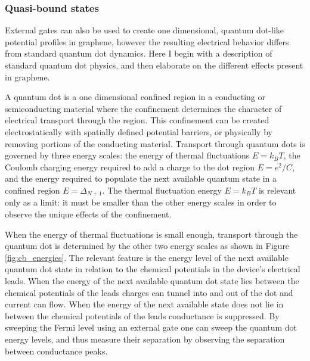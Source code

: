 \documentclass[edeposit,fullpage,draftthesis]{uiucthesis2009}
\begin{document}
        \subsubsection*{Quasi-bound states}
        
        External gates can also be used to create one dimensional, quantum dot-like potential profiles in graphene,
        however the resulting electrical behavior differs from standard quantum dot dynamics. Here I begin with
        a description of standard quantum dot physics, and then elaborate on the different effects present in graphene.
        
        A quantum dot is a one dimensional confined region in a conducting or semiconducting material
        where the confinement determines the character of electrical transport through the region. 
        This confinement can be created electrostatically with
        spatially defined potential barriers, or physically by removing portions of the conducting material.
        Transport through quantum dots is governed by three energy scales: the energy of thermal
        fluctuations $E=k_B T$, the Coulomb charging energy required to add a charge to the dot region $E = e^2/C$,
        and the energy required to populate the next available quantum state in a confined region $E = \Delta_{N+1}$.
        The thermal fluctuation energy $E = k_B T$ is relevant only as a limit: it must be smaller than
        the other energy scales in order to observe the unique effects of the confinement. 
        
        When the energy of thermal fluctuations is small enough,
        transport through the quantum dot is determined by the other two energy scales as shown in 
        Figure \ref{fig:cb_energies}. The relevant feature is the energy level of the next available quantum dot
        state in relation to the chemical potentials in the device's electrical leads.
        When the energy of the next available quantum dot state lies between
        the chemical potentials of the leads charges can tunnel into and out of the dot and
        current can flow.
        When the energy of the next available state does not lie in between the chemical potentials of the leads
        conductance is suppressed. 
        By sweeping the Fermi level using an external gate one can sweep the quantum dot energy levels,
        and thus measure their separation by observing the separation between conductance peaks.
        
        
\end{document}
